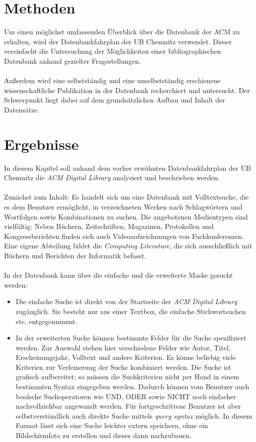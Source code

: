 \documentclass[
	ngerman,
	parskip=half,
	headsepline,
	fontsize=12pt,
	DIV=13,
	listof=leveldown,
	]{scrreprt}
\begin{document}
	\chapter{Methoden}
	Um einen möglichst umfassenden Überblick über die Datenbank der ACM zu erhalten, wird der Datenbankfahrplan der UB Chemnitz \cite{resource:dbf} verwendet. Dieser vereinfacht die Untersuchung der Möglichkeiten einer bibliographischen Datenbank anhand gezielter Fragestellungen.
\ \\	
\ \\
	Außerdem wird eine selbstständig und eine unselbstständig erschienene wissenschaftliche Publikation in der Datenbank recherchiert und untersucht. Der Schwerpunkt liegt dabei auf dem grundsätzlichen Aufbau und Inhalt der Datensätze.
	
	
		\chapter{Ergebnisse}
	In diesem Kapitel soll anhand dem vorher erwähnten Datenbankfahrplan der UB Chemnitz \cite{resource:dbf} die \textsl{ACM Digital Library} analysiert und beschrieben werden.
		\ \\
		\ \\
		Zunächst zum Inhalt: Es handelt sich um eine Datenbank mit Volltextsuche, die es dem Benutzer ermöglicht, in verzeichneten Werken nach Schlagwörtern und Wortfolgen sowie Kombinationen zu suchen. Die angebotenen Medientypen sind vielfältig: Neben Büchern, Zeitschriften, Magazinen, Protokollen und Kongressberichten finden sich auch Videoaufzeichnungen von Fachkonferenzen.
		\ \\
		Eine eigene Abteilung bildet die \textsl{Computing Literature}, die sich ausschließlich mit Büchern und Berichten der Informatik befasst.
		\ \\
		\ \\
		In der Datenbank kann über die einfache und die erweiterte Maske gesucht werden:
		\begin{itemize}
		\item Die einfache Suche ist direkt von der Startseite der \textsl{ACM Digital Library} zugänglich. Sie besteht nur aus einer Textbox, die einfache Stichwortsuchen etc. entgegennimmt.
		\item In der erweiterten Suche können bestimmte Felder für die Suche spezifiziert werden. Zur Auswahl stehen hier verschiedene Felder wie Autor, Titel, Erscheinungsjahr, Volltext und andere Kriterien. Es könne beliebig viele Kriterien zur Verfeinerung der Suche kombiniert werden. Die Suche ist grafisch aufbereitet; so müssen die Suchkriterien nicht per Hand in einem bestimmten Syntax eingegeben werden. Dadurch können vom Benutzer auch boolsche Suchoperatoren wie UND, ODER sowie NICHT noch einfacher nachvollziehbar angewandt werden. Für fortgeschrittene Benutzer ist aber selbstverständlich auch direkte Suche mittels \textit{query syntax} möglich. In diesem Format lässt sich eine Suche leichter extern speichern, ohne ein Bildschirmfoto zu erstellen und dieses dann nachzubauen.
		\end{itemize}
\end{document}

